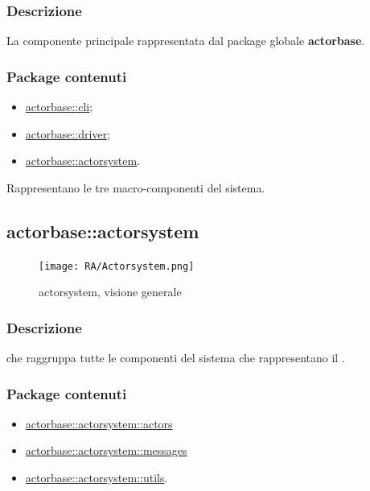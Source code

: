 \documentclass{scalatekids-article}
\begin{document}
\subsubsection{Descrizione}

La componente principale rappresentata dal package globale \textbf{actorbase}.

\subsubsection{Package contenuti}

\begin{itemize}
\item \hyperref[sec:actorbase::cli]{actorbase::cli};
\item \hyperref[sec:actorbase::driver]{actorbase::driver};
\item \hyperref[sec:actorbase::actorsystem]{actorbase::actorsystem}.
\end{itemize}

Rappresentano le tre macro-componenti del sistema.


\subsection{actorbase::actorsystem}
\label{sec:actorbase::actorsystem}

\begin{figure}[H]
  \begin{center}
    \texttt{[image: RA/Actorsystem.png]}
    \caption{ actorsystem, visione generale}
  \end{center}
\end{figure}

\subsubsection{Descrizione}

 che raggruppa tutte le componenti del sistema che
rappresentano il .

\subsubsection{Package contenuti}

\begin{itemize}
\item \hyperref[sec:actorbase::actorsystem::actors]{actorbase::actorsystem::actors}
\item \hyperref[sec:actorbase::actorsystem::messages]{actorbase::actorsystem::messages}
\item \hyperref[sec:actorbase::actorsystem::utils]{actorbase::actorsystem::utils}.
\end{itemize}
\end{document}
